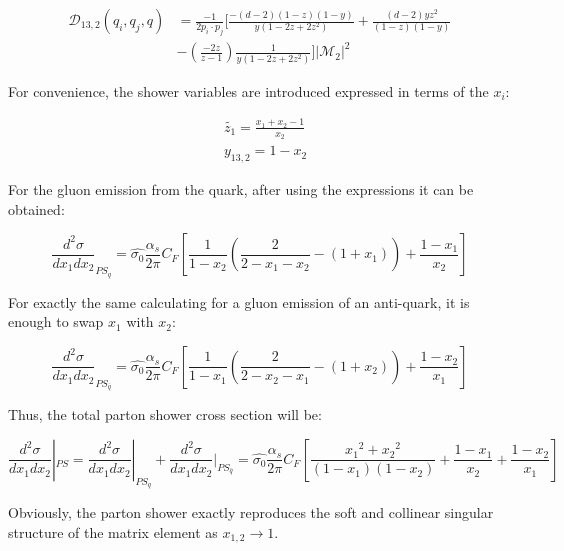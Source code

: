 \begin{equation}
\begin{split}
\mathcal{D}_{13,2} (q_i,q_j,q) &= \frac{-1}{2p_i \cdot p_j}[\frac{-(d-2)(1-z)(1-y) }{y(1-2z+2z^2)}+\frac{(d-2)yz^2}{(1-z)(1-y)}\\
&-(\frac{-2z}{z-1}) \frac{1}{y(1-2z+2z^2)}]|\mathcal{M}_{2}|^2
\end{split}
\end{equation}

For convenience, the shower variables are introduced expressed in terms of the $ x_i $:

\begin{equation}
\begin{split}
&\tilde{z_1}=\frac{x_1+x_2-1}{x_2}\\
&y_{13,2} =1-x_2
\end{split}
\end{equation}

For the gluon emission from the quark, after using the expressions it can be obtained:

\begin{equation}
\frac{d^2 \sigma}{dx_1 dx_2}_{PS_q}= \hat{\sigma_0}
\frac{\alpha_s}{2\pi} C_F [\frac{1}{1-x_2} (\frac{2}{2-x_1-x_2}-(1+x_1))+\frac{1-x_1}{x_2}]
\end{equation}

For exactly the same calculating for a gluon emission of an anti-quark, it is enough to swap $ x_1 $ with $ x_2 $:

\begin{equation}
\frac{d^2 \sigma}{dx_1 dx_2}_{PS_{\bar{q}}}= \hat{\sigma_0}
\frac{\alpha_s}{2\pi} C_F [\frac{1}{1-x_1} (\frac{2}{2-x_2-x_1}-(1+x_2))+\frac{1-x_2}{x_1}]
\end{equation}

Thus, the total parton shower cross section will be:

\begin{equation}
\frac{d^2 \sigma}{dx_1 dx_2}|_{PS}=\frac{d^2 \sigma}{dx_1 dx_2}|_{PS_q}+\frac{d^2 \sigma}{dx_1 dx_2}|_{PS_{\bar{q}}}= \hat{\sigma_0}
\frac{\alpha_s}{2\pi} C_F [\frac{{x_1}^2+{x_2}^2}{(1-x_1)(1-x_2)}+\frac{1-x_1}{x_2}+\frac{1-x_2}{x_1}]
\end{equation}

Obviously, the parton shower exactly reproduces the soft and collinear singular structure of the matrix element as $ x_{1,2} \rightarrow 1 $.